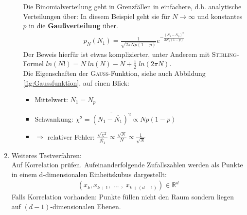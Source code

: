\documentclass[12pt]{article}
\begin{document}
\begin{enumerate}
\begin{itemize}
Die Binomialverteilung geht in Grenzfällen in einfachere, d.h. analytische Verteilungen über: In diesem Beispiel geht sie für $N \to \infty$ und konstantes $p$ in die \textbf{Gaußverteilung} über.
\begin{align}
p_N (N_1) = \frac{1}{\sqrt{2 \pi N p (1-p)}} e^{- \frac{(N_1 - N_p)^2}{2 N_p (1-p)}}
\end{align}
Der Beweis hierfür ist etwas komplizierter, unter Anderem mit \textsc{Stirling}-Formel $ln(N!) = N \; ln(N) - N + \frac{1}{2} \; ln( 2 \pi N)$. \\
Die Eigenschaften der \textsc{Gauß}-Funktion, siehe auch Abbildung \ref{fig:Gaussfunktion}, auf einen Blick:
\begin{itemize}
\item Mittelwert: $\overline{N_1}= N_p$
\item Schwankung: $\chi ^2 = \overline{(N_1 - \overline{N_1})^2} \propto N p (1-p)$ 
\item $\Rightarrow$ relativer Fehler: $\frac{\sqrt{\chi ^2}}{\overline{N_1}} \propto \frac{\sqrt{N}}{N} \propto \frac{1}{\sqrt{N}}$ 
\end{itemize}
\end{itemize}
\item Weiteres Testverfahren: \\
Auf Korrelation prüfen. Aufeinanderfolgende Zufallszahlen werden als Punkte in einem d-dimensionalen Einheitskubus dargestellt:
\begin{align}
(x_k, x_{k+1}, \; ...\; ,\; x_{k+(d-1)}) \in \mathbb{R}^d
\end{align}
Falls Korrelation vorhanden: Punkte füllen nicht den Raum sondern liegen auf $(d-1)$-dimensionalen Ebenen. \\


\end{enumerate}
\end{document}
